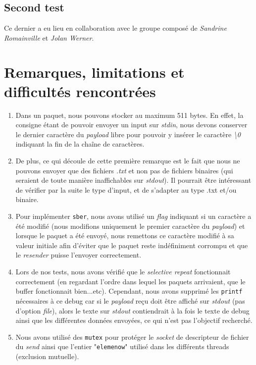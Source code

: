 \documentclass[11pt]{article}
\begin{document}
\subsection{Second test}
Ce dernier a eu lieu en collaboration avec le groupe composé de \textit{Sandrine Romainville} et \textit{Jolan Werner}.

\section{Remarques, limitations et difficultés rencontrées}
\begin{enumerate}
\item Dans un paquet, nous pouvons stocker au maximum 511 bytes. En effet, la consigne étant de pouvoir envoyer un input sur \textit{stdin}, nous devons conserver le dernier caractère du \textit{payload} libre pour pouvoir y insérer le caractère \textit{\textbackslash 0} indiquant la fin de la chaîne de caractères. 
\smallskip
\item De plus, ce qui découle de cette première remarque est le fait que nous ne pouvons envoyer que des fichiers \textit{.txt} et non pas de fichiers binaires (qui seraient de toute manière inaffichables sur \textit{stdout}). Il pourrait être intéressant de vérifier par la suite le type d'input, et de s'adapter au type .txt et/ou binaire.
\smallskip
\item Pour implémenter \texttt{sber}, nous avons utilisé un \textit{flag} indiquant si un caractère a été modifié (nous modifions uniquement le premier caractère du \textit{payload}) et lorsque le paquet a été envoyé, nous remettons ce caractère modifié à sa valeur initiale afin d'éviter que le paquet reste indéfiniment corrompu et que le \textit{resender} puisse l'envoyer correctement.
\smallskip
\item Lors de nos tests, nous avons vérifié que le \textit{selective repeat} fonctionnait correctement (en regardant l'ordre dans lequel les paquets arrivaient, que le buffer fonctionnait bien...etc). Cependant, nous avons supprimé les \texttt{printf} nécessaires à ce debug car si le \textit{payload} reçu doit être affiché sur \textit{stdout} (pas d'option \textit{file}), alors le texte sur \textit{stdout} contiendrait à la fois le texte de debug ainsi que les différentes données envoyées, ce qui n'est pas l'objectif recherché. 
\smallskip
\item Nous avons utilisé des \texttt{mutex} pour protéger le \textit{socket} de descripteur de fichier du \textit{send} ainsi que l'entier "\texttt{elemenow}" utilisé dans les différents threads (exclusion mutuelle).
\end{enumerate}
\end{document}
